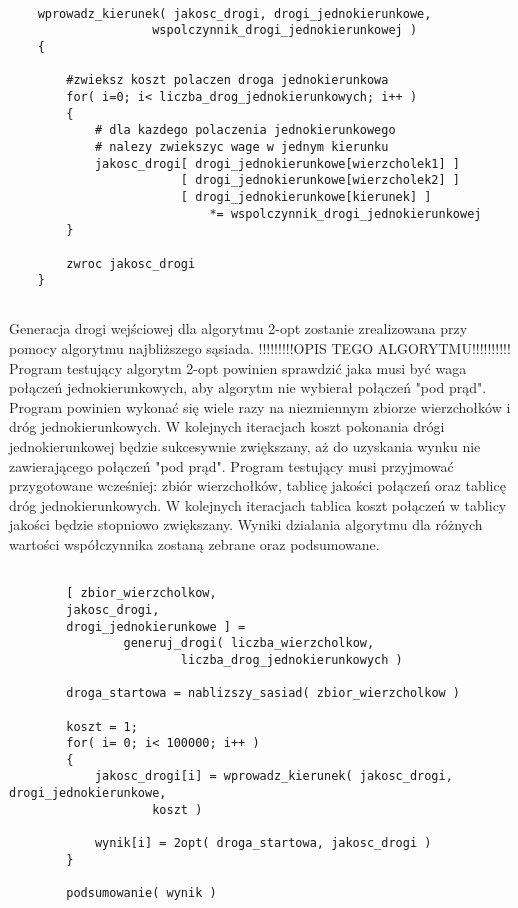 \documentclass{article}
\begin{document}
\begin{lstlisting}[caption={Funkcja wprowadzająca koszt połączeń jednokierunkowych}]

	wprowadz_kierunek( jakosc_drogi, drogi_jednokierunkowe,
					wspolczynnik_drogi_jednokierunkowej )
	{	

		#zwieksz koszt polaczen droga jednokierunkowa
		for( i=0; i< liczba_drog_jednokierunkowych; i++ )
		{
			# dla kazdego polaczenia jednokierunkowego
			# nalezy zwiekszyc wage w jednym kierunku
			jakosc_drogi[ drogi_jednokierunkowe[wierzcholek1] ]
						[ drogi_jednokierunkowe[wierzcholek2] ]
						[ drogi_jednokierunkowe[kierunek] ] 
							*= wspolczynnik_drogi_jednokierunkowej
		}		
		
		zwroc jakosc_drogi
	}
		

\end{lstlisting}


Generacja drogi wejściowej dla algorytmu 2-opt zostanie zrealizowana przy pomocy algorytmu najbliższego sąsiada. 
!!!!!!!!!OPIS TEGO ALGORYTMU!!!!!!!!!! \\



Program testujący algorytm 2-opt powinien sprawdzić jaka musi być waga połączeń jednokierunkowych, aby algorytm nie wybierał połączeń "pod prąd". Program powinien wykonać się wiele razy na niezmiennym zbiorze wierzchołków i dróg jednokierunkowych. W kolejnych iteracjach koszt pokonania drógi jednokierunkowej będzie sukcesywnie zwiększany, aż do uzyskania wynku nie zawierającego połączeń "pod prąd".
Program testujący musi przyjmować przygotowane wcześniej: zbiór wierzchołków, tablicę jakości połączeń oraz tablicę dróg jednokierunkowych. W kolejnych iteracjach tablica koszt połączeń w tablicy jakości będzie stopniowo zwiększany. Wyniki dzialania algorytmu dla różnych wartości współczynnika zostaną zebrane oraz podsumowane.


\begin{lstlisting}[caption={Funkcja testująca algorytm}]

		[ zbior_wierzcholkow, 
		jakosc_drogi, 
		drogi_jednokierunkowe ] = 
				generuj_drogi( liczba_wierzcholkow, 
						liczba_drog_jednokierunkowych )
		
		droga_startowa = nablizszy_sasiad( zbior_wierzcholkow )
		
		koszt = 1;
		for( i= 0; i< 100000; i++ )
		{
			jakosc_drogi[i] = wprowadz_kierunek( jakosc_drogi, drogi_jednokierunkowe,
					koszt )
			
			wynik[i] = 2opt( droga_startowa, jakosc_drogi )
		}
		
		podsumowanie( wynik )

\end{lstlisting}
\end{document}
